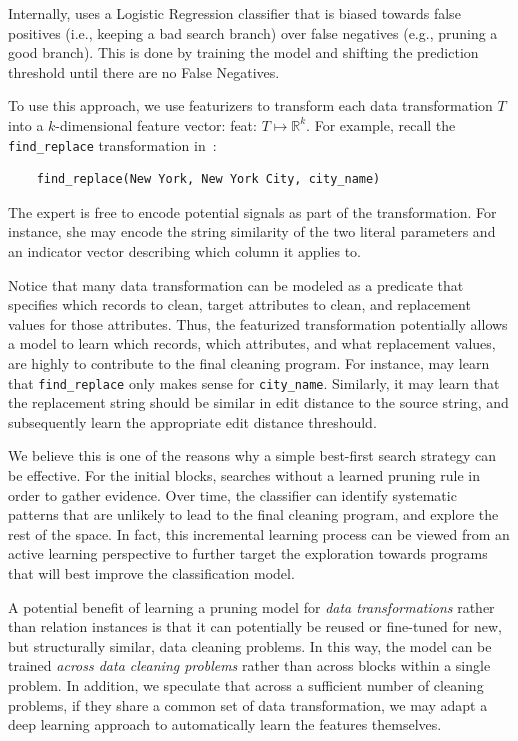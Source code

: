 Internally, \sys uses a Logistic Regression classifier that is biased towards false positives (i.e., keeping a bad search branch) over false negatives (e.g., pruning a good branch). This is done by training the model and shifting the prediction threshold until there are no False Negatives. 


To use this approach, we use featurizers to transform each data transformation $T$ into a $k$-dimensional feature vector: \textsf{feat}: $T\mapsto\mathbb{R}^k$.
For example, recall the \texttt{find\_replace} transformation in~:
\begin{lstlisting}
    find_replace(New York, New York City, city_name)
\end{lstlisting}
The expert is free to encode potential signals as part of the transformation.  For instance, she may encode the string similarity of the two literal parameters and an indicator vector describing which column it applies to.  

Notice that many data transformation can be modeled as a predicate that specifies which records to clean, target attributes to clean, and replacement values for those attributes.  Thus, the featurized transformation potentially allows a model to learn which records, which attributes, and what replacement values, are highly to contribute to the final cleaning program.  For instance, \sys may learn that \texttt{find\_replace} only makes sense for \texttt{city\_name}.  Similarly, it may learn that the replacement string should be similar in edit distance to the source string, and subsequently learn the appropriate edit distance threshould.


 We believe this is one of the reasons why a simple best-first search strategy can be effective.  For the initial blocks, \sys searches without a learned pruning rule in order to gather evidence.  Over time, the classifier can identify systematic patterns that are unlikely to lead to the final cleaning program, and explore the rest of the space.  In fact, this incremental learning process can be viewed from an active learning perspective to further target the exploration towards programs that will best improve the classification model.  

A potential benefit of learning a pruning model for {\it data transformations} rather than relation instances is that it can potentially be reused or fine-tuned for new, but structurally similar, data cleaning problems. In this way, the model can be trained {\it across data cleaning problems} rather than across blocks within a single problem.    In addition, we speculate that across a sufficient number of cleaning problems, if they share a common set of data transformation, we may adapt a deep learning approach to automatically learn the features themselves.  



